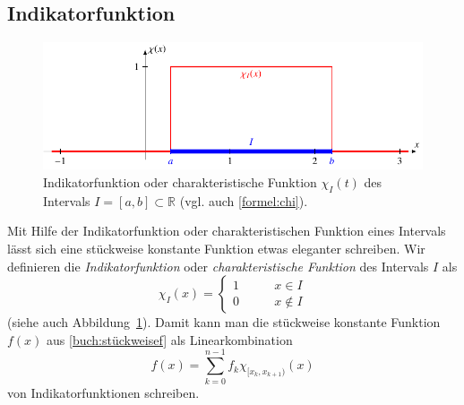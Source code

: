 \subsection{Indikatorfunktion}
\begin{figure}
\centering
\includegraphics{chapters/3-haar/images/chi.pdf}
\caption{Indikatorfunktion oder charakteristische Funktion $\chi_I(t)$
des Intervals $I=[a,b]\subset \mathbb R$ (vgl. auch \eqref{formel:chi}).
\label{haar:figure:chi}}
\end{figure}
Mit Hilfe der Indikatorfunktion oder charakteristischen Funktion
eines Intervals lässt sich eine stückweise konstante Funktion etwas
eleganter schreiben.
Wir definieren  die
{\em Indikatorfunktion}
%
oder
{\em charakteristische Funktion}
des Intervals $I$ als
\begin{equation}
\chi_{I}(x) = \begin{cases}
1&\qquad x\in I\\
0&\qquad x\not\in I
\end{cases}
\label{formel:chi}
\end{equation}
(siehe auch Abbildung~\ref{haar:figure:chi}).
Damit kann man die stückweise konstante Funktion $f(x)$ aus
\eqref{buch:stückweisef}
als Linearkombination
\[
f(x)
=
\sum_{k=0}^{n-1} f_k\chi_{[x_k,x_{k+1})}(x)
\]
von Indikatorfunktionen schreiben.

